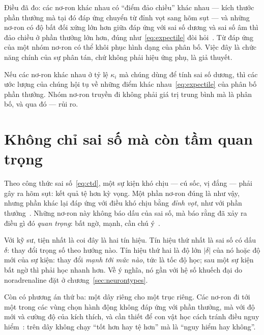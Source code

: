Điều đã đo: các nơ-ron  khác nhau có ``điểm đảo chiều'' khác nhau --- kích thước phần thưởng mà tại đó đáp ứng chuyển từ đỉnh vọt sang hõm sụt --- và những nơ-ron có độ bất đối xứng lớn hơn giữa đáp ứng với sai số dương và sai số âm thì đảo chiều ở phần thưởng lớn hơn, đúng như~\eqref{eq:expectile} đòi hỏi~\cite{Dabney2020}. Từ đáp ứng của một nhóm nơ-ron có thể khôi phục hình dạng của phân bố. Việc đây là chức năng chính của sự phân tán, chứ không phải hiệu ứng phụ, là giả thuyết.

\begin{keyblock}
\begin{proposition}
\label{prop:expectile}
Nếu các nơ-ron  khác nhau ở tỷ lệ $\kappa_i$ mà chúng dùng để tính sai số dương, thì các ước lượng của chúng hội tụ về những điểm khác nhau~\eqref{eq:expectile} của phân bố phần thưởng. Nhóm nơ-ron truyền đi không phải giá trị trung bình mà là phân bố, và qua đó --- rủi ro.
\end{proposition}
\end{keyblock}

\section{Không chỉ sai số mà còn tầm quan trọng}

Theo công thức sai số~\eqref{eq:ctd}, một sự kiện khó chịu --- cú sốc, vị đắng --- phải gây ra hõm sụt: kết quả tệ hơn kỳ vọng. Một phần nơ-ron  đúng là như vậy, nhưng phần khác lại đáp ứng với điều khó chịu bằng \emph{đỉnh vọt}, như với phần thưởng~\cite{Matsumoto2009}. Những nơ-ron này không báo dấu của sai số, mà báo rằng đã xảy ra điều gì đó \emph{quan trọng}: bất ngờ, mạnh, cần chú ý~\cite{BrombergMartin2010}.

Với kỹ sư, tiện nhất là coi đây là hai tín hiệu. Tín hiệu thứ nhất là sai số có dấu $\delta$: thay đổi trọng số theo hướng nào. Tín hiệu thứ hai là độ lớn $|\delta|$ của nó hoặc độ mới của sự kiện: thay đổi \emph{mạnh tới mức nào}, tức là tốc độ học; sau một sự kiện bất ngờ thì phải học nhanh hơn. Về ý nghĩa, nó gần với hệ số khuếch đại do noradrenaline đặt ở chương~\ref{sec:neurontypes}.

Còn có phương án thứ ba: một dây riêng cho một trục riêng. Các nơ-ron  đi tới một trong các vùng chọn hành động không đáp ứng với phần thưởng, mà với độ mới và cường độ của kích thích, và cần thiết để con vật học cách tránh điều nguy hiểm~\cite{Menegas2018}: trên dây không chạy ``tốt hơn hay tệ hơn'' mà là ``nguy hiểm hay không''.

